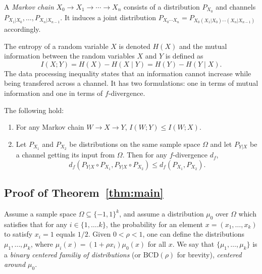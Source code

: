 \documentclass[final, 12pt]{colt2018}
\providecommand{\BCD}{\mathrm{BCD}}
\begin{document}
\begin{definition}
A \emph{Markov chain} $X_0 \to X_1 \to \cdots \to X_n$ consists of a distribution $P_{X_0}$ and channels $P_{X_1 | X_0}, \dots, P_{X_n | X_{n-1}}$. It induces a joint distribution $P_{X_0 \cdots X_n} = P_{X_0 (X_1 |X_0) \cdots (X_n | X_{n-1})}$ accordingly.
\end{definition}

The entropy of a random variable $X$ is denoted $H(X)$ and the mutual information between the random variables $X$ and $Y$ is defined as 
\[
I(X; Y) = H(X) - H(X \mid Y) = H(Y) - H(Y \mid X).
\]
The data processing inequality states that an information cannot increase while being transfered across a channel. It has two formulations: one in terms of mutual information and one in terms of $f$-divergence.

\begin{proposition} \label{prop:DPI}
The following hold:
\begin{enumerate}
\item For any Markov chain $W \to X \to Y$, $I(W;Y) \le I(W;X)$.
\item Let $P_{X_1}$ and $P_{X_2}$ be distributions on the same sample space $\Omega$ and let $P_{Y|X}$ be a channel getting its input from $\Omega$. Then for any $f$-divergence $d_f$,
\[ d_f( P_{Y|X} \circ P_{X_1}, P_{Y|X} \circ P_{X_2}) \le d_f(P_{X_1}, P_{X_2}). \]
\end{enumerate}
\end{proposition}

\subsection{Proof of Theorem~\ref{thm:main}} \label{sec:main-pr}

Assume a sample space $\Omega \subseteq \{-1,1\}^k$, and assume a distribution $\mu_0$ over $\Omega$ which satisfies that for any $i \in \{1,\dots. k\}$, the probability for an element $x = (x_1,\dots,x_k)$ to satisfy $x_i = 1$ equals $1/2$. Given $0 < \rho < 1$, one can define the distributions $\mu_1, \dots, \mu_k$, where $\mu_i(x) = (1 + \rho x_i) \mu_0(x)$ for all $x$. We say that $\{ \mu_1, \dots, \mu_k \}$ is a \emph{binary centered familiy of distributions} (or $\BCD(\rho)$ for brevity), \emph{centered around $\mu_0$}.
\end{document}
